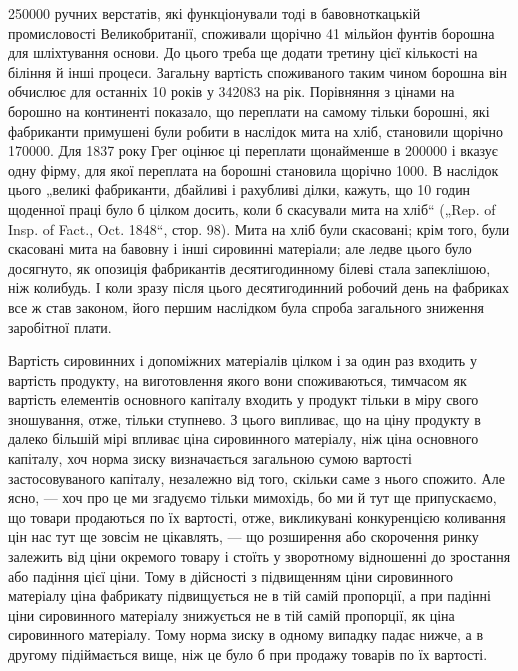 \parcont{}  %
\num{250000} ручних верстатів, які функціонували тоді в бавовноткацькій
промисловості Великобританії, споживали щорічно 41 мільйон
фунтів борошна для шліхтування основи. До цього треба
ще додати третину цієї кількості на біління й інші процеси.
Загальну вартість споживаного таким чином борошна він обчислює
для останніх 10 років у \num{342083} на рік.
Порівняння з цінами на борошно на континенті показало, що
переплати на самому тільки борошні, які фабриканти примушені
були робити в наслідок мита на хліб, становили щорічно
\num{170000}. Для 1837 року Грег оцінює ці
переплати щонайменше в \num{200000} і вказує
одну фірму, для якої переплата на борошні становила щорічно
1000. В наслідок цього „великі фабриканти,
дбайливі і рахубливі ділки, кажуть, що 10 годин щоденної
праці було б цілком досить, коли б скасували мита на хліб“
(„Rep. of Insp. of Fact., Oct. 1848“, стор. 98). Мита на хліб
були скасовані; крім того, були скасовані мита на бавовну
і інші сировинні матеріали; але ледве цього було досягнуто, як
опозиція фабрикантів десятигодинному білеві стала запеклішою,
ніж колибудь. І коли зразу після цього десятигодинний робочий
день на фабриках все ж став законом, його першим наслідком
була спроба загального зниження заробітної плати.

Вартість сировинних і допоміжних матеріалів цілком і за один
раз входить у вартість продукту, на виготовлення якого вони споживаються,
тимчасом як вартість елементів основного капіталу
входить у продукт тільки в міру свого зношування, отже, тільки
ступнево. З цього випливає, що на ціну продукту в далеко більшій
мірі впливає ціна сировинного матеріалу, ніж ціна основного
капіталу, хоч норма зиску визначається загальною сумою вартості
застосовуваного капіталу, незалежно від того, скільки
саме з нього спожито. Але ясно, — хоч про це ми згадуємо
тільки мимохідь, бо ми й тут ще припускаємо, що товари продаються
по їх вартості, отже, викликувані конкуренцією коливання
цін нас тут ще зовсім не цікавлять, — що розширення або
скорочення ринку залежить від ціни окремого товару і стоїть
у зворотному відношенні до зростання або падіння цієї ціни.
Тому в дійсності з підвищенням ціни сировинного матеріалу ціна
фабрикату підвищується не в тій самій пропорції, а при падінні
ціни сировинного матеріалу знижується не в тій самій пропорції,
як ціна сировинного матеріалу. Тому норма зиску в
одному випадку падає нижче, а в другому підіймається вище,
ніж це було б при продажу товарів по їх вартості.

